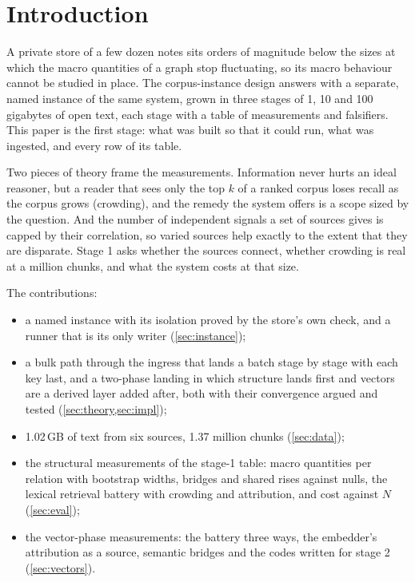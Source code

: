 \documentclass[11pt]{article}
\theoremstyle{plain}
\theoremstyle{definition}
\theoremstyle{remark}
\begin{document}
\section{Introduction}
A private store of a few dozen notes sits orders of magnitude below the sizes at which the macro
quantities of a graph stop fluctuating, so its macro behaviour cannot be studied in place. The
corpus-instance design \citep{serranocalva2026palace} answers with a separate, named instance of the
same system, grown in three stages of 1, 10 and 100 gigabytes of open text, each stage with a table of
measurements and falsifiers. This paper is the first stage: what was built so that it could run, what
was ingested, and every row of its table.

Two pieces of theory frame the measurements. Information never hurts an ideal reasoner, but a reader
that sees only the top $k$ of a ranked corpus loses recall as the corpus grows (crowding), and the
remedy the system offers is a scope sized by the question. And the number of independent signals a
set of sources gives is capped by their correlation, so varied sources help exactly to the extent
that they are disparate. Stage 1 asks whether the sources connect, whether crowding is real at a
million chunks, and what the system costs at that size.

The contributions:
\begin{itemize}
\item a named instance with its isolation proved by the store's own check, and a runner that is its
  only writer (\cref{sec:instance});
\item a bulk path through the ingress that lands a batch stage by stage with each key last, and a
  two-phase landing in which structure lands first and vectors are a derived layer added after,
  both with their convergence argued and tested (\cref{sec:theory,sec:impl});
\item 1.02\,GB of text from six sources, 1.37 million chunks (\cref{sec:data});
\item the structural measurements of the stage-1 table: macro quantities per relation with bootstrap
  widths, bridges and shared rises against nulls, the lexical retrieval battery with crowding and
  attribution, and cost against $N$ (\cref{sec:eval});
\item the vector-phase measurements: the battery three ways, the embedder's attribution as a source,
  semantic bridges and the codes written for stage 2 (\cref{sec:vectors}).
\end{itemize}
\end{document}
